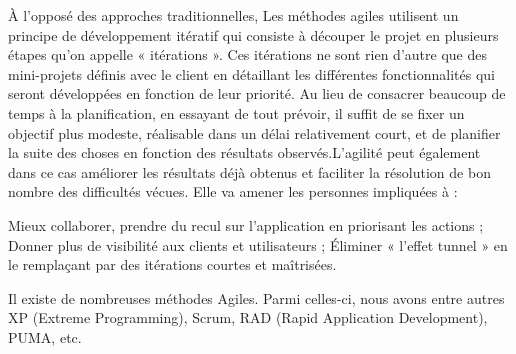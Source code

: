 À l’opposé des approches traditionnelles, Les méthodes agiles utilisent un principe de développement itératif qui consiste à découper le projet en plusieurs étapes qu’on appelle « itérations ». Ces itérations ne sont rien d’autre que des mini-projets définis avec le client en détaillant les différentes fonctionnalités qui seront développées en fonction de leur priorité. Au lieu de consacrer beaucoup de temps à la planification, en essayant de tout prévoir, il suffit de se fixer un objectif plus modeste, réalisable dans un délai relativement court, et de planifier la suite des choses en fonction des résultats observés.L’agilité peut également dans ce cas améliorer les résultats déjà obtenus et faciliter la résolution de bon nombre des difficultés vécues. Elle va amener les personnes impliquées à :
\begin{itemize}
	\itemtirait Mieux collaborer, prendre du recul sur l’application en priorisant les actions ;
	\itemtirait Donner plus de visibilité aux clients et utilisateurs ;
	\itemtirait Éliminer « l’effet tunnel »  en le remplaçant par des itérations courtes et maîtrisées.
\end{itemize}
Il existe de nombreuses méthodes Agiles. Parmi celles-ci, nous avons entre autres XP (Extreme Programming), Scrum, RAD (Rapid Application Development), PUMA, etc.
